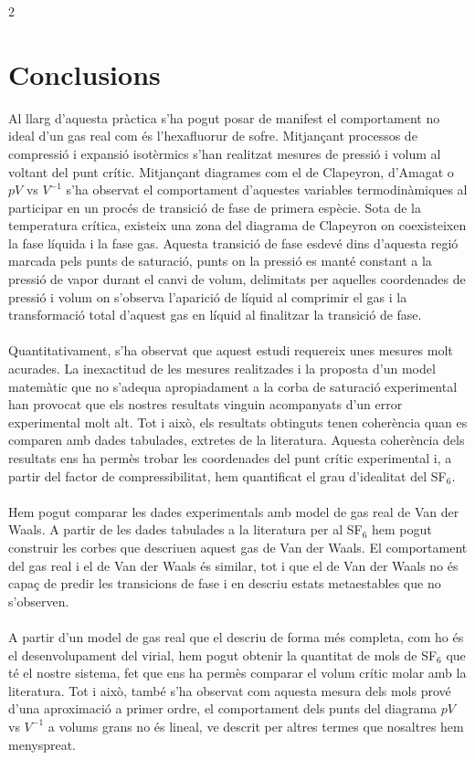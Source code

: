 \documentclass[12pt,twosides,onecolumn,openany]{article}
\begin{document}
\begin{multicols}{2}
\section{Conclusions}
Al llarg d'aquesta pràctica s'ha pogut posar de manifest el comportament no ideal d'un gas real com és l'hexafluorur de sofre. Mitjançant processos de compressió i expansió isotèrmics s'han realitzat mesures de pressió i volum al voltant del punt crític. Mitjançant diagrames com el de Clapeyron, d'Amagat o $pV$ vs $V^{-1}$ s'ha observat el comportament d'aquestes variables termodinàmiques al participar en un procés de transició de fase de primera espècie. Sota de la temperatura crítica, existeix una zona del diagrama de Clapeyron on coexisteixen la fase líquida i la fase gas. Aquesta transició de fase esdevé dins d'aquesta regió marcada pels punts de saturació, punts on la pressió es manté constant a la pressió de vapor durant el canvi de volum, delimitats per aquelles coordenades de pressió i volum on s'observa l'aparició de líquid al comprimir el gas i la transformació total d'aquest gas en líquid al finalitzar la transició de fase.\\\\
Quantitativament, s'ha observat que aquest estudi requereix unes mesures molt acurades. La inexactitud de les mesures realitzades i la proposta d'un model matemàtic que no s'adequa apropiadament a la corba de saturació experimental han provocat que els nostres resultats vinguin acompanyats d'un error experimental molt alt. Tot i això, els resultats obtinguts tenen coherència quan es comparen amb dades tabulades, extretes de la literatura. Aquesta coherència dels resultats ens ha permès trobar les coordenades del punt crític experimental i, a partir del factor de compressibilitat, hem quantificat el grau d'idealitat del SF$_6$.\\\\
Hem pogut comparar les dades experimentals amb model de gas real de Van der Waals. A partir de les dades tabulades a la literatura per al SF$_6$ hem pogut construir les corbes que descriuen aquest gas de Van der Waals. El comportament del gas real i el de Van der Waals és similar, tot i que el de Van der Waals no és capaç de predir les transicions de fase i en descriu estats metaestables que no s'observen.\\\\
A partir d'un model de gas real que el descriu de forma més completa, com ho és el desenvolupament del virial, hem pogut obtenir la quantitat de mols de SF$_6$ que té el nostre sistema, fet que ens ha permès comparar el volum crític molar amb la literatura. Tot i això, també s'ha observat com aquesta mesura dels mols prové d'una aproximació a primer ordre, el comportament dels punts del diagrama $pV$ vs $V^{-1}$ a volums grans no és lineal, ve descrit per altres termes que nosaltres hem menyspreat.

\end{multicols}
\end{document}
